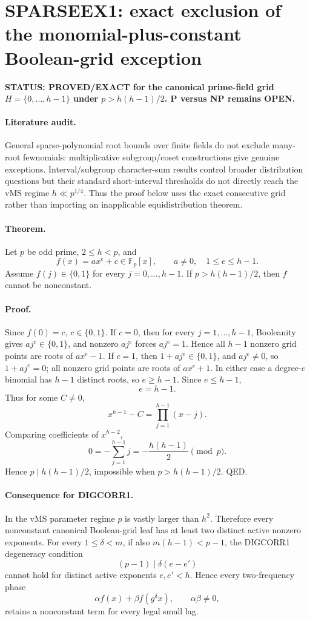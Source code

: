 \documentclass[11pt]{article}\usepackage[margin=.88in]{geometry}\usepackage{amsmath,amssymb}
\begin{document}
\section*{SPARSEEX1: exact exclusion of the monomial-plus-constant Boolean-grid exception}
\textbf{STATUS: PROVED/EXACT for the canonical prime-field grid \(H=\{0,\ldots,h-1\}\) under \(p>h(h-1)/2\). P versus NP remains OPEN.}
\paragraph{Literature audit.}
General sparse-polynomial root bounds over finite fields do not exclude many-root fewnomials: multiplicative subgroup/coset constructions give genuine exceptions. Interval/subgroup character-sum results control broader distribution questions but their standard short-interval thresholds do not directly reach the vMS regime \(h\ll p^{1/4}\). Thus the proof below uses the exact consecutive grid rather than importing an inapplicable equidistribution theorem.
\paragraph{Theorem.}
Let \(p\) be odd prime, \(2\le h<p\), and
\[
f(x)=ax^e+c\in\mathbb F_p[x],\qquad a\ne0,\quad1\le e\le h-1.
\]
Assume \(f(j)\in\{0,1\}\) for every \(j=0,\ldots,h-1\). If \(p>h(h-1)/2\), then \(f\) cannot be nonconstant.
\paragraph{Proof.}
Since \(f(0)=c\), \(c\in\{0,1\}\). If \(c=0\), then for every \(j=1,\ldots,h-1\), Booleanity gives \(aj^e\in\{0,1\}\), and nonzero \(aj^e\) forces \(aj^e=1\). Hence all \(h-1\) nonzero grid points are roots of \(ax^e-1\). If \(c=1\), then \(1+aj^e\in\{0,1\}\), and \(aj^e\ne0\), so \(1+aj^e=0\); all nonzero grid points are roots of \(ax^e+1\). In either case a degree-\(e\) binomial has \(h-1\) distinct roots, so \(e\ge h-1\). Since \(e\le h-1\),
\[
e=h-1.
\]
Thus for some \(C\ne0\),
\[
x^{h-1}-C=\prod_{j=1}^{h-1}(x-j).
\]
Comparing coefficients of \(x^{h-2}\),
\[
0=-\sum_{j=1}^{h-1}j=-\frac{h(h-1)}2\pmod p.
\]
Hence \(p\mid h(h-1)/2\), impossible when \(p>h(h-1)/2\). QED.
\paragraph{Consequence for DIGCORR1.}
In the vMS parameter regime \(p\) is vastly larger than \(h^2\). Therefore every nonconstant canonical Boolean-grid leaf has at least two distinct active nonzero exponents. For every \(1\le\delta<m\), if also \(m(h-1)<p-1\), the DIGCORR1 degeneracy condition
\[
(p-1)\mid\delta(e-e')
\]
cannot hold for distinct active exponents \(e,e'<h\). Hence every two-frequency phase
\[
\alpha f(x)+\beta f(g^\delta x),\qquad\alpha\beta\ne0,
\]
retains a nonconstant term for every legal small lag.
\end{document}
